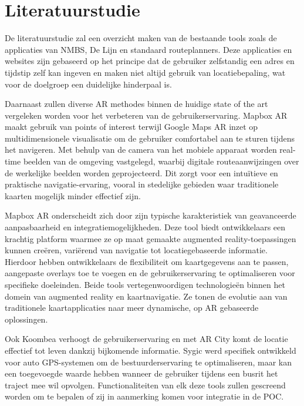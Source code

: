 \documentclass{hogent-article}
\begin{document}
    \section{Literatuurstudie}%
    \label{sec:literatuurstudie}
    
    De literatuurstudie zal een overzicht maken van de bestaande tools zoals de applicaties van NMBS, De Lijn en standaard routeplanners. Deze applicaties en websites zijn gebaseerd op het principe dat de gebruiker zelfstandig een adres en tijdstip zelf kan ingeven en maken niet altijd gebruik van locatiebepaling, wat voor de doelgroep een duidelijke hinderpaal is.
    
    Daarnaast zullen diverse AR methodes binnen de huidige state of the art vergeleken worden voor het verbeteren van de gebruikerservaring. Mapbox AR maakt gebruik van points of interest terwijl Google Maps AR inzet op multidimensionele visualisatie om de gebruiker comfortabel aan te sturen tijdens het navigeren. Met behulp van de camera van het mobiele apparaat worden real-time beelden van de omgeving vastgelegd, waarbij digitale routeaanwijzingen over de werkelijke beelden worden geprojecteerd. Dit zorgt voor een intuïtieve en praktische navigatie-ervaring, vooral in stedelijke gebieden waar traditionele kaarten mogelijk minder effectief zijn. 
    
    Mapbox AR onderscheidt zich door zijn typische karakteristiek van geavanceerde aanpasbaarheid en integratiemogelijkheden. Deze tool biedt ontwikkelaars een krachtig platform waarmee ze op maat gemaakte augmented reality-toepassingen kunnen creëren, variërend van navigatie tot locatiegebaseerde informatie. Hierdoor hebben ontwikkelaars de flexibiliteit om kaartgegevens aan te passen, aangepaste overlays toe te voegen en de gebruikerservaring te optimaliseren voor specifieke doeleinden. Beide tools vertegenwoordigen technologieën binnen het domein van augmented reality en kaartnavigatie. Ze tonen de evolutie aan van traditionele kaartapplicaties naar meer dynamische, op AR gebaseerde oplossingen.  
     
    Ook Koombea verhoogt de gebruikerservaring en met AR City komt de locatie effectief tot leven dankzij bijkomende informatie. Sygic werd specifiek ontwikkeld voor auto GPS-systemen om de bestuurderservaring te optimaliseren, maar kan een toegevoegde waarde hebben wanneer de gebruiker tijdens een busrit het traject mee wil opvolgen. Functionaliteiten van elk deze tools zullen gescreend worden om te bepalen of zij in aanmerking komen voor integratie in de POC. 
    
\end{document}
